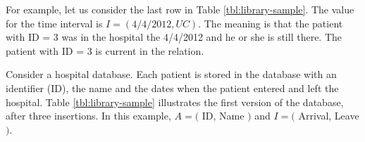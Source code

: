 
For example, let us consider the last row in Table \ref{tbl:library-sample}. The value for the time interval is $I = \left(4/4/2012 , UC \right)$. The meaning is that the patient with ID = 3 was in the hospital the  4/4/2012 and he or she is still there. The patient with ID = 3 is current in the relation.


\begin{example}
\label{ex:library-database}
 Consider a hospital database. Each patient is stored in the database with an identifier (ID), the name and the dates when the patient entered and left the hospital. Table \ref{tbl:library-sample} illustrates the first version of the database, after three insertions. In this example, $A = ($ ID, Name $)$ and $I = ($ Arrival, Leave $)$.
\end{example}



